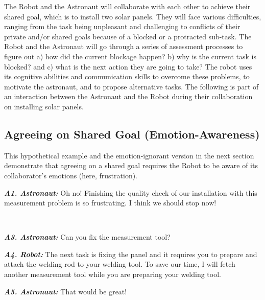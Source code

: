 The Robot and the Astronaut will collaborate with each other to achieve their
shared goal, which is to install two solar panels. They will face various
difficulties, ranging from the task being unpleasant and challenging to
conflicts of their private and/or shared goals because of a blocked or a
protracted sub-task. The Robot and the Astronaut will go through a series of
assessment processes to figure out a) how did the current blockage happen? b)
why is the current task is blocked? and c) what is the next action they are
going to take? The robot uses its cognitive abilities and communication skills
to overcome these problems, to motivate the astronaut, and to propose
alternative tasks. The following is part of an interaction between the Astronaut
and the Robot during their collaboration on installing solar panels.

\subsection{Agreeing on Shared Goal (Emotion-Awareness)}
\label{sec:exp1}

This hypothetical example and the emotion-ignorant version in the next section
demonstrate that agreeing on a shared goal requires the Robot to be aware of its
collaborator's emotions (here, frustration). 

\begin{description}
  \item \textit{\textbf{A1. Astronaut:}} Oh no! Finishing the quality check of
  our installation with this measurement problem is so frustrating. I think we
  should stop now!\\

  \item {}\\
  
  \item \textit{\textbf{A3. Astronaut:}} Can you fix the measurement tool?\\

  \item \textit{\textbf{A4. Robot:}} The next task is fixing the panel and it
  requires you to prepare and attach the welding rod to your welding tool. To
  save our time, I will fetch another measurement tool while you are preparing
  your welding tool.\\

  \item \textit{\textbf{A5. Astronaut:}} That would be great!
  
\end{description}

